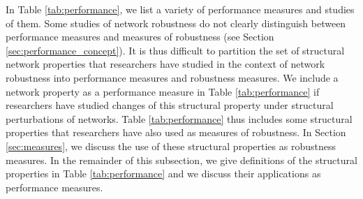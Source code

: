\documentclass{comnet-mod}
\begin{document}
In Table \ref{tab:performance}, we list a variety of performance measures and studies of them. Some studies of network robustness do not clearly distinguish between performance measures and measures of robustness (see Section \ref{sec:performance_concept}). It is thus difficult to partition the set of structural network properties that researchers have studied in the context of network robustness into performance measures and robustness measures. We include a network property as a performance measure in Table \ref{tab:performance} if researchers have studied changes of this structural property under structural perturbations of networks. Table \ref{tab:performance} thus includes some structural properties that researchers have also used as measures of robustness. In Section \ref{sec:measures}, we discuss the use of these structural properties as robustness measures. In the remainder of this subsection, we give definitions of the structural properties in Table \ref{tab:performance} and we discuss their applications as performance measures.
\end{document}
